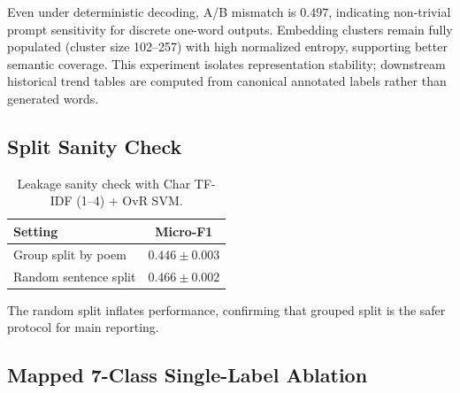 \documentclass[11pt]{article}
\begin{document}
Even under deterministic decoding, A/B mismatch is \(0.497\), indicating non-trivial prompt sensitivity for discrete one-word outputs.
Embedding clusters remain fully populated (cluster size 102--257) with high normalized entropy, supporting better semantic coverage.
This experiment isolates representation stability; downstream historical trend tables are computed from canonical annotated labels rather than generated words.

\subsection{Split Sanity Check}

\begin{table}[t]
\centering
\small
\begin{tabular}{lc}
\toprule
Setting & Micro-F1 \\
\midrule
Group split by poem & \(0.446 \pm 0.003\) \\
Random sentence split & \(\mathbf{0.466 \pm 0.002}\) \\
\bottomrule
\end{tabular}
\caption{Leakage sanity check with Char TF-IDF (1--4) + OvR SVM.}
\label{tab:ablation}
\end{table}

The random split inflates performance, confirming that grouped split is the safer protocol for main reporting.

\subsection{Mapped 7-Class Single-Label Ablation}

\begin{table}[t]
\centering
\small
{}
\caption{Mapped 7-class single-label diagnostic ablation.}
\label{tab:svm_mapped_ablation}
\end{table}
\end{document}
